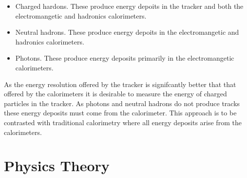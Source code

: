 \begin{itemize}
\item Charged hardons.  These produce energy depoits in the tracker and both the electromangetic and hadronics calorimeters.
\item Neutral hadrons.  These produce energy depoits in the electromangetic and hadronics calorimeters.
\item Photons.  These produce energy deposits primarily in the electromangetic calorimeters. 
\end{itemize}

As the energy resolution offered by the tracker is signifcantly better that that offered by the calorimeters it is desirable to measure the energy of charged particles in the tracker.  As photons and neutral hadrons do not produce tracks these energy deposits must come from the calorimeter.  This approach is to be contrasted with traditional calorimetry where all energy deposits arise from the calorimeters.  


\section{Physics Theory }
